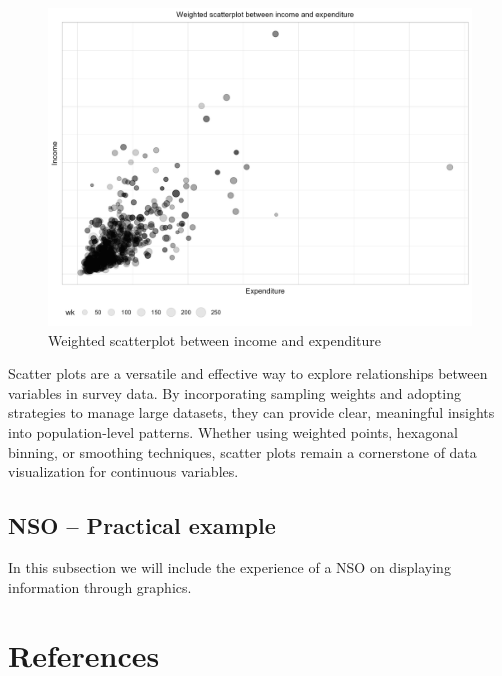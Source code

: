 \documentclass[
  12pt,
]{book}
\begin{document}
\begin{figure}
\includegraphics[width=33.33in]{www/05_graficas/02_scatterplot_ingreso_gasto} \caption{Weighted scatterplot between income and expenditure}\label{fig:ScatterIncome}
\end{figure}

Scatter plots are a versatile and effective way to explore relationships between variables in survey data. By incorporating sampling weights and adopting strategies to manage large datasets, they can provide clear, meaningful insights into population-level patterns. Whether using weighted points, hexagonal binning, or smoothing techniques, scatter plots remain a cornerstone of data visualization for continuous variables.

\hypertarget{nso-practical-example-2}{%
\section{NSO -- Practical example}\label{nso-practical-example-2}}

In this subsection we will include the experience of a NSO on displaying information through graphics.

\hypertarget{references}{%
\chapter*{References}\label{references}}

  
\end{document}
